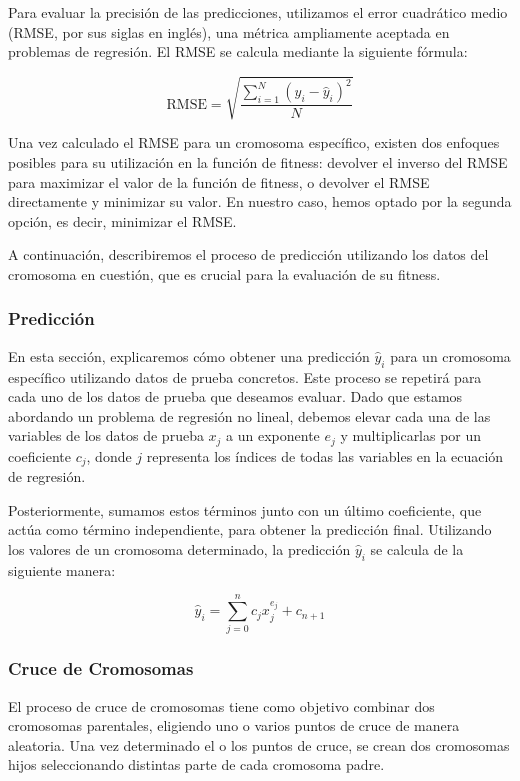 \documentclass[conference,a4paper]{IEEEtran}
\begin{document}
Para evaluar la precisión de las predicciones, utilizamos el error cuadrático medio (RMSE, por sus siglas en inglés), una métrica ampliamente aceptada en problemas de regresión. El RMSE se calcula mediante la siguiente fórmula:

\[
\text{RMSE} = \sqrt{\frac{\sum_{i=1}^{N} (y_i - \hat{y}_i)^2}{N}}
\]


Una vez calculado el RMSE para un cromosoma específico, existen dos enfoques posibles para su utilización en la función de fitness: devolver el inverso del RMSE para maximizar el valor de la función de fitness, o devolver el RMSE directamente y minimizar su valor. En nuestro caso, hemos optado por la segunda opción, es decir, minimizar el RMSE.

A continuación, describiremos el proceso de predicción utilizando los datos del cromosoma en cuestión, que es crucial para la evaluación de su fitness.

\subsubsection{Predicción}
En esta sección, explicaremos cómo obtener una predicción \(\hat{y}_i\) para un cromosoma específico utilizando datos de prueba concretos. Este proceso se repetirá para cada uno de los datos de prueba que deseamos evaluar. Dado que estamos abordando un problema de regresión no lineal, debemos elevar cada una de las variables de los datos de prueba \(x_j\) a un exponente \(e_j\) y multiplicarlas por un coeficiente \(c_j\), donde \(j\) representa los índices de todas las variables en la ecuación de regresión. 

Posteriormente, sumamos estos términos junto con un último coeficiente, que actúa como término independiente, para obtener la predicción final. Utilizando los valores de un cromosoma determinado, la predicción \(\hat{y}_i\) se calcula de la siguiente manera:

\[
\hat{y}_i = \sum_{j=0}^{n} c_j x_j^{e_j} + c_{n+1}
\]


\subsubsection{Cruce de Cromosomas}
El proceso de cruce de cromosomas tiene como objetivo combinar dos cromosomas parentales, eligiendo uno o varios puntos de cruce de manera aleatoria. Una vez determinado el o los puntos de cruce, se crean dos cromosomas hijos seleccionando distintas parte de cada cromosoma padre. 
\end{document}
